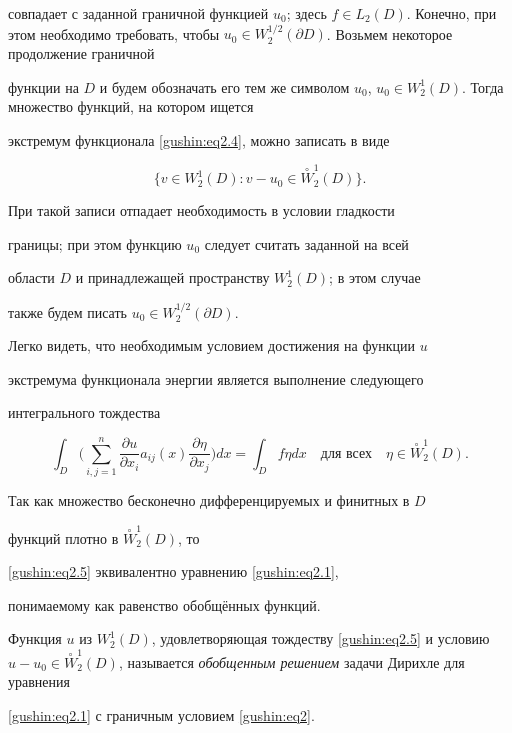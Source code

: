 совпадает с заданной граничной функцией $u_0$; здесь $f \in

L_2(D)$. Конечно, при этом необходимо требовать, чтобы $u_0 \in

W^{1/2}_2(\partial D)$. Возьмем некоторое продолжение граничной

функции на $D$ и будем обозначать  его тем же символом $u_0$, $u_0

\in W_2^1(D)$. Тогда множество функций, на котором ищется

экстремум функционала \eqref{gushin:eq2.4}, можно записать в виде

$$\{ v \in W_2^1(D) : v - u_0 \in {\stackrel{\circ}{W}_2^1(D)}\}.$$

При такой записи отпадает необходимость в условии гладкости

границы; при этом функцию $u_0$ следует считать заданной на всей

области $D$ и принадлежащей пространству $W_2^1(D)$; в этом случае

также будем писать $u_0 \in W^{1/2}_2(\partial D)$.



Легко видеть, что необходимым условием достижения на функции $u$

экстремума функционала энергии является выполнение следующего

интегрального тождества

\begin{equation}

\label{gushin:eq2.5} \int _D \biggl(\sum_{i,j=1}^n

\frac{\partial u}{\partial x_i} a_{ij}(x) \frac{\partial

\eta}{\partial x_j}\biggr)dx = \int _D f \eta dx \quad

\text{для всех} \quad \eta \in {\stackrel{\circ}{W}_2^1(D)}.

\end{equation}

Так как множество бесконечно дифференцируемых и финитных в $D$

функций плотно в ${\stackrel{\circ}{W}_2^1(D)}$, то

\eqref{gushin:eq2.5} эквивалентно  уравнению \eqref{gushin:eq2.1},

понимаемому как равенство обобщённых функций.



\smallskip



\begin{definition}[2]Функция $u$ из $W_2^1(D)$, удовлетворяющая тождеству \eqref{gushin:eq2.5} и условию ${u - u_0

\in {\stackrel{\circ}{W}_2^1(D)}}$, называется {\it обобщенным решением} задачи Дирихле для уравнения

\eqref{gushin:eq2.1} с граничным условием \eqref{gushin:eq2}.

\end{definition}




